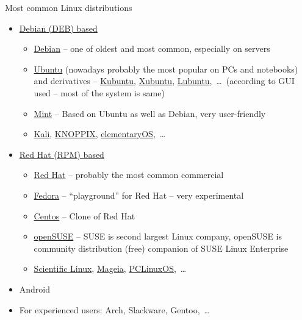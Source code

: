 \documentclass[compress, ucs, xelatex, 11pt, xcolor=svgnames,
  hyperref={
    bookmarks=true,
    unicode=true,
    colorlinks=true,
    pdftitle={Linux, command line and MetaCentrum},
    plainpages=false,
    pdfauthor={Vojtech Zeisek},
    pdfsubject={Course about use of Linux command line, writing shell scripts and using MetaCentrum of CESNET},
    pdfcreator={XeLaTeX},
    pdfkeywords={Linux, GNU, BASH, shell, command line, MetaCentrum},
    linkcolor=DarkRed,
    anchorcolor=DarkBlue,
    citecolor=Indigo,
    filecolor=NavyBlue,
    menucolor=DarkMagenta,
    urlcolor=DarkBlue,
    pdftex},
  url={hyphens, lowtilde} %
  ]{beamer}
\begin{document}
\begin{frame}{Most common Linux distributions}
  \begin{itemize}
    \item \href{http://distrowatch.com/search.php?package=DEB}{Debian (DEB) based}
    \begin{itemize}
      \item \href{https://www.debian.org/}{Debian} -- one of oldest and most common, especially on servers
      \item \href{http://www.ubuntu.com/}{Ubuntu} (nowadays probably the most popular on PCs and notebooks) and derivatives -- \href{https://www.kubuntu.org/}{Kubuntu}, \href{https://xubuntu.org/}{Xubuntu}, \href{http://lubuntu.net/}{Lubuntu},~\ldots~(according to GUI used -- most of the system is same)
      \item \href{http://linuxmint.com/}{Mint} -- Based on Ubuntu as well as Debian, very user-friendly
      \item \href{https://www.kali.org/}{Kali}, \href{http://knopper.net/knoppix/index-en.html}{KNOPPIX}, \href{https://elementary.io/}{elementaryOS},~\ldots
    \end{itemize}
    \item \href{http://distrowatch.com/search.php?package=RPM}{Red Hat (RPM) based}
    \begin{itemize}
      \item \href{https://www.redhat.com/}{Red Hat} -- probably the most common commercial
      \item \href{https://getfedora.org/}{Fedora} -- ``playground'' for Red Hat -- very experimental
      \item \href{https://www.centos.org/}{Centos} -- Clone of Red Hat
      \item \href{https://www.opensuse.org/}{openSUSE} -- SUSE is second largest Linux company, openSUSE is community distribution (free) companion of SUSE Linux Enterprise
      \item \href{https://www.scientificlinux.org/}{Scientific Linux}, \href{https://www.mageia.org/}{Mageia}, \href{http://www.pclinuxos.com/}{PCLinuxOS},~\ldots
    \end{itemize}
    \item Android
    \item For experienced users: Arch, Slackware, Gentoo,~\ldots
  \end{itemize}
\end{frame}
\end{document}
